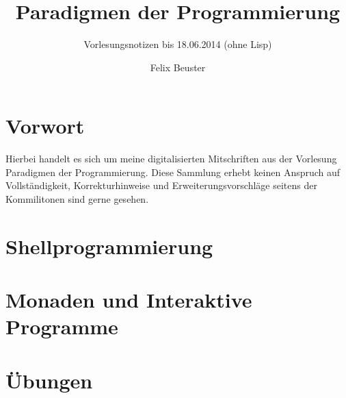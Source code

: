 \documentclass[11pt,a4paper]{scrartcl}
\title{Paradigmen der Programmierung}
\subtitle{Vorlesungsnotizen bis 18.06.2014 (ohne Lisp)}
\author{Felix Beuster}
\date{}
\begin{document}
\setlength{\parindent}{0ex}
\maketitle
\newpage
\tableofcontents
\newpage

\section*{Vorwort} %
\label{sec:vorwort}

	Hierbei handelt es sich um meine digitalisierten Mitschriften aus der Vorlesung Paradigmen der
	Programmierung. Diese Sammlung erhebt keinen Anspruch auf Vollständigkeit, Korrekturhinweise
	und Erweiterungsvorschläge seitens der Kommilitonen sind gerne gesehen.


\section{Shellprogrammierung} %
\label{sec:shellprogrammierung}

\clearpage
\section{Monaden und Interaktive Programme} %
\label{sec:monaden_und_interaktive_programme}

\clearpage
\appendix
\section{Übungen} %
\label{sec:uebungen}
\end{document}

